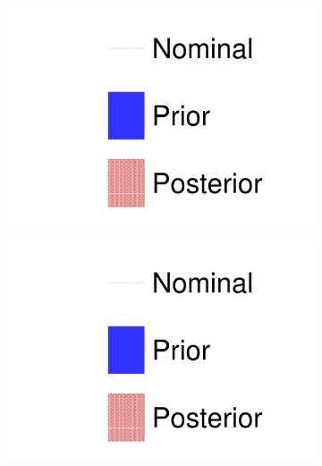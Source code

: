\begin{figure}[h]
	\begin{subfigure}[t]{0.32\textwidth}
		\includegraphics[width=\textwidth, trim={0mm 0mm 0mm 0mm}, clip, page=2]{figures/mach3/data/prior_error_1june_try_2017_fit_on_sk_spectra}
	\end{subfigure}
	\begin{subfigure}[t]{0.32\textwidth}
		\includegraphics[width=\textwidth, trim={0mm 0mm 0mm 0mm}, clip, page=3]{figures/mach3/data/prior_error_1june_try_2017_fit_on_sk_spectra}
	\end{subfigure}
	\begin{subfigure}[t]{0.32\textwidth}

\end{subfigure}
\end{figure}
